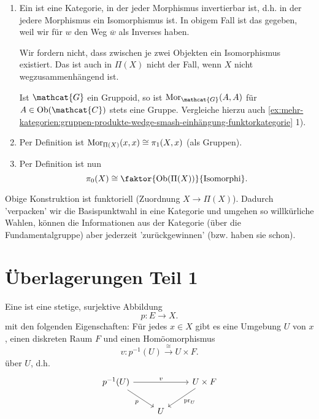 \begin{remark*}
    \begin{enumerate}[1)]
        \item Ein  ist eine Kategorie, in der jeder Morphismus invertierbar ist, d.h. in der jedere Morphismus ein Isomorphismus ist. In obigem Fall ist das gegeben, weil wir für $w$ den Weg $\overline{w}$ als Inverses haben.
            \begin{warning}
                Wir fordern nicht, dass zwischen je zwei Objekten ein Isomorphismus existiert. Das ist auch in $\Pi(X)$ nicht der Fall, wenn  $X$ nicht wegzusammenhängend ist.
            \end{warning}
            Ist $\mathcat{G}$ ein Gruppoid, so ist $\Mor_{\mathcat{G}}(A,A)$ für $A\in \Ob(\mathcat{C})$ stets eine Gruppe. Vergleiche hierzu auch \autoref{ex:mehr-kategorien:gruppen-produkte-wedge-smash-einhängung-funktorkategorie} 1).
        \item Per Definition ist $\operatorname{Mor}_{\Pi(X)}(x,x) \cong \pi_1(X,x)$ (als Gruppen).
        \item Per Definition ist nun
            \[
                \pi_0(X) \cong \faktor{\Ob(\Pi(X))}{\text{Isomorphi}}
            .\] 
    \end{enumerate}
\end{remark*}

\begin{oral}
    Obige Konstruktion ist funktoriell (Zuordnung $X \to  \Pi(X)$). Dadurch 'verpacken' wir die Basispunktwahl in eine Kategorie und umgehen so willkürliche Wahlen, können die Informationen aus der Kategorie (über die Fundamentalgruppe) aber jederzeit 'zurückgewinnen' (bzw. haben sie schon).
\end{oral}


\section{Überlagerungen Teil 1}

\begin{definition}[Überlagerung]\label{def:überlagerung}
    Eine  ist eine stetige, surjektive Abbildung
    \[
    p\colon  E \to  X
    .\] 
    mit den folgenden Eigenschaften:
    Für jedes $x\in X$ gibt es eine Umgebung $U$ von  $x$, einen diskreten Raum  $F$ und einen Homöomorphismus
     \[
         v\colon  p^{-1}(U) \stackrel{\cong}{\longrightarrow} U \times F
    .\] 
    über $U$, d.h.
    \[
\begin{tikzcd}
    p^{-1}(U) \ar{rr}{v} \ar[swap]{dr}{p}& &  U \times F \ar{dl}{\pr_U} \\
                          & U
\end{tikzcd}
\]
\end{definition}

